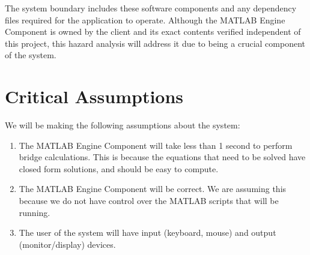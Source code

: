\documentclass{article}
\begin{document}
The system boundary includes these software components and any dependency files required for the application to operate. Although the MATLAB Engine Component is owned by the client and its exact contents verified independent of this project, this hazard analysis will address it due to being a crucial component of the system.

\section{Critical Assumptions}

We will be making the following assumptions about the system:
\begin{enumerate}
    \item The MATLAB Engine Component will take less than 1 second to perform bridge calculations. 
    This is because the equations that need to be solved have closed form solutions, and should be easy
    to compute.
    \item The MATLAB Engine Component will be correct. We are assuming this because we do not have control
    over the MATLAB scripts that will be running.
    \item The user of the system will have input (keyboard, mouse) and output (monitor/display) devices.
\end{enumerate}
\end{document}

